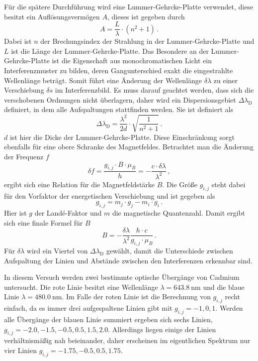 Für die spätere Durchführung wird eine Lummer-Gehrcke-Platte verwendet, diese besitzt ein Auflösungsvermögen $A$, dieses ist gegeben durch 
\begin{equation}
    A = \frac{L}{\lambda} \cdot \left( n^2 + 1 \right) \, .
   \label{eq:aufloesung}
\end{equation}
Dabei ist $n$ der Brechungsindex der Strahlung in der Lummer-Gehrcke-Platte und $L$ ist die Länge der Lummer-Gehrcke-Platte. 
Das Besondere an der Lummer-Gehrcke-Platte ist die Eigenschaft aus monochromatischen Licht ein Interferenzmuster zu bilden, deren Gangunterschied exakt die eingestrahlte Wellenlänge beträgt.
Somit führt eine Änderung der Wellenlänge $\delta \lambda$ zu einer Verschiebung $\delta s$ im Interferenzbild.
Es muss darauf geachtet werden, dass sich die verschobenen Ordnungen nicht überlagern, daher wird ein Dispersionsgebiet $\Delta \lambda _\text{D}$ definiert, in dem alle Aufspaltungen stattfinden werden. 
Sie ist definiert als 
\begin{equation}
    \Delta \lambda _\text{D} = \frac{\lambda ^2}{2 d} \cdot \sqrt{ \frac{1}{n^2 + 1}    } \, .
   \label{eq:dispers}
\end{equation}
$d$ ist hier die Dicke der Lummer-Gehrcke-Platte.
Diese Einschränkung sorgt ebenfalls für eine obere Schranke des Magnetfeldes.
Betrachtet man die Änderung der Frequenz $f$
\begin{equation}
    \delta f = \frac{g_{i,j} \cdot B \cdot \mu_B }{h} = - \frac{c \cdot \delta \lambda}{\lambda ^2} \, ,
   \label{eq:freq}
\end{equation}
ergibt sich eine Relation für die Magnetfeldstärke $B$.
Die Größe $g_{i,j}$ steht dabei für den Vorfaktor der energetischen Verschiebung und ist gegeben als
\begin{equation}
    g_{i,j} = m_j \cdot g_j - m_i \cdot g_i \, .
   \label{eq:gij}
\end{equation}
Hier ist $g$ der Landé-Faktor und $m$ die magnetische Quantenzahl.
Damit ergibt sich eine finale Formel für $B$
\begin{equation}
    B = - \frac{\delta \lambda}{\lambda ^2} \frac{h \cdot c}{g_{i,j}  \cdot \mu_B} \, .
   \label{eq:bfeld}
\end{equation}
Für $\delta \lambda $ wird ein Viertel von $\Delta \lambda _\text{D}$ gewählt, damit die Unterschiede zwischen Aufspaltung der Linien und Abstände zwischen den Interferenzen erkennbar sind.

In diesem Versuch werden zwei bestimmte optische Übergänge von Cadmium untersucht.
Die rote Linie besitzt eine Wellenlänge $\lambda = \SI{643.8}{\nano\meter}$ und die blaue Linie $\lambda = \SI{480.0}{\nano\meter}$.
Im Falle der roten Linie ist die Berechnung von $g_{i,j}$ recht einfach, da es immer drei aufgespaltene Linien gibt mit $g_{i,j} = -1, 0, 1$.
Werden alle Übergänge der blauen Linie summiert ergeben sich sechs Linien, $g_{i,j} = -2.0, -1.5, -0.5, 0.5, 1.5, 2.0$.
Allerdings liegen einige der Linien verhältnismäßig nah beieinander, daher erscheinen im eigentlichen Spektrum nur vier Linien $g_{i,j} = -1.75, -0.5, 0.5, 1.75$.